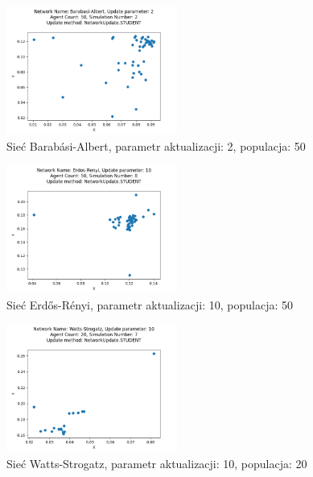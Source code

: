 \begin{figure}
    \centering
    \includegraphics[width=0.5\textwidth]{img/barabasi_albert_2_50_2_student.png}
    \caption{Sieć Barabási-Albert, parametr aktualizacji: 2, populacja: 50}
    \label{fig:barabasi_albert_2_50_2_student}
\end{figure}

\begin{figure}
    \centering
    \includegraphics[width=0.5\textwidth]{img/erdos_renyi_10_50_8_student.png}
    \caption{Sieć Erdős-Rényi, parametr aktualizacji: 10, populacja: 50}
    \label{fig:erdos_renyi_10_50_8_student}
\end{figure}

\begin{figure}
    \centering
    \includegraphics[width=0.5\textwidth]{img/watts_strogatz_10_20_7_student.png}
    \caption{Sieć Watts-Strogatz, parametr aktualizacji: 10, populacja: 20}
    \label{fig:watts_strogatz_10_20_7_student}
\end{figure}

